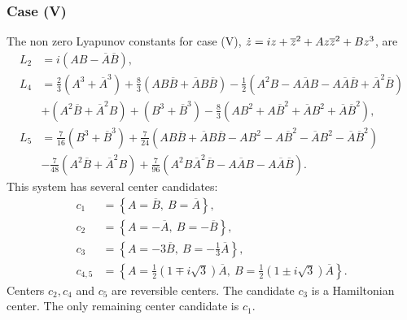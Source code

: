 \subsubsection{Case (V)}
The non zero Lyapunov constants for case (V), $\dot z = iz+\overline{z}^2+Az\overline{z}^2+Bz^3$, are
\begin{align*}
L_2&=i(AB-\overline A\overline B),\\
L_4&=\frac{2}{3}(A^3+\overline A^3)+\frac{8}{3}(AB\overline B+\overline AB\overline B) -\frac{1}{2}(A^2B-A\overline A B-A\overline A\overline B+\overline A^2\overline B)\\
&+(A^2\overline B+\overline A^2B)+(B^3+\overline B^3)-\frac{8}{3}(AB^2+A\overline B^2+\overline AB^2+\overline A \overline B^2),\\
L_5&=\frac{7}{16}(B^3+\overline B^3)+\frac{7}{24}(AB\overline B+\overline AB\overline B-AB^2-A\overline B^2-\overline AB^2-\overline A\overline B^2)\\
&-\frac{7}{48}(A^2\overline B+\overline A^2 B)+\frac{7}{96}(A^2B\overline A^2\overline B-A\overline A B-A\overline A\overline B).
\end{align*}
This system has several center candidates:
\begin{align*}
c_1&=\left\{A=\overline B,~B=\overline A\right\},\\
c_2&=\left\{A=-\overline A,~B=-\overline B\right\},\\
c_3&=\left\{A=-3\overline B,~B=-\frac{1}{3}\overline A\right\},\\
c_{4,5}&=\left\{A=\frac{1}{2}\left(1\mp i\sqrt{3}\right)\overline A,~B=\frac{1}{2}\left(1\pm i\sqrt{3}\right)\overline A\right\}.
\end{align*}
Centers $c_2,c_4$ and $c_5$ are reversible centers. The candidate $c_3$ is a Hamiltonian center. The only remaining center candidate is $c_1$.

